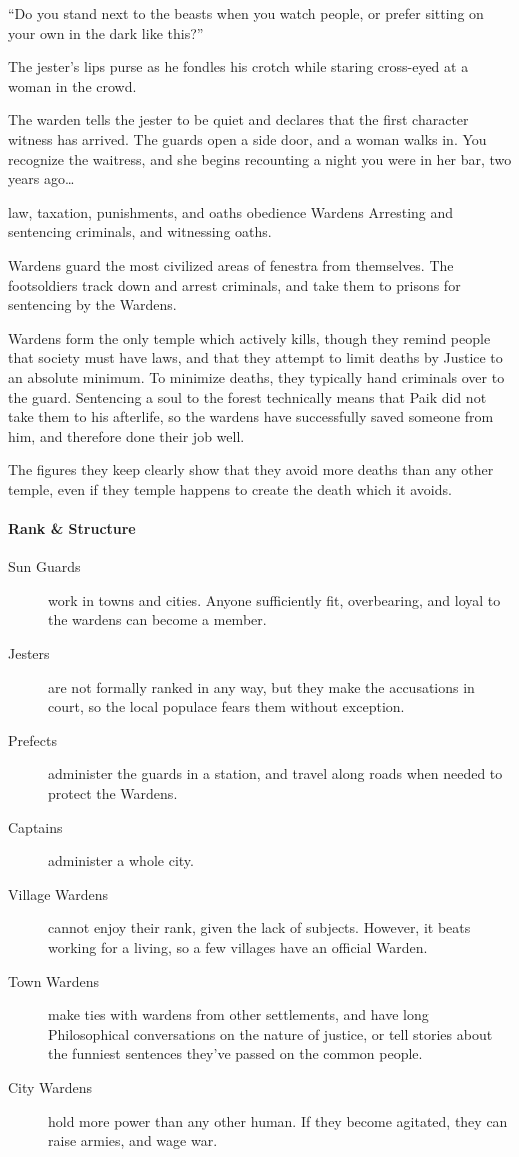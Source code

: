 \begin{multicols}{2}
{    {\sffamily ``Do you stand next to the beasts when you watch people, or prefer sitting on your own in the dark like this?''}

    The jester's lips purse as he fondles his crotch while staring cross-eyed at a woman in the crowd.

    The warden tells the jester to be quiet and declares that the first character witness has arrived.
    The guards open a side door, and a woman walks in.
    You recognize the waitress, and she begins recounting a night you were in her bar, two years ago\ldots
  }%
  {law, taxation, punishments, and oaths}%
  {obedience}%
  {Wardens}%
  {
    Arresting and sentencing criminals, and witnessing oaths.
  }%

Wardens guard the most civilized areas of \gls{fenestra} from themselves.
The footsoldiers track down and arrest criminals, and take them to prisons for sentencing by the Wardens.

Wardens form the only temple which actively kills, though they remind people that society must have laws, and that they attempt to limit deaths by Justice to an absolute minimum.
To minimize deaths, they typically hand criminals over to the \gls{guard}.
Sentencing a soul to the forest technically means that Paik did not take them to his afterlife, so the wardens have successfully saved someone from him, and therefore done their job well.

The figures they keep clearly show that they avoid more deaths than any other temple, even if they temple happens to create the death which it avoids.

\paragraph{Rank \& Structure}

\begin{description}
  \item[Sun Guards]
  work in towns and cities.
  Anyone sufficiently fit, overbearing, and loyal to the wardens can become a member.
  \item[Jesters]
  are not formally ranked in any way, but they make the accusations in court, so the local populace fears them without exception.
  \item[Prefects]
  administer the guards in a station, and travel along roads when needed to protect the Wardens.
  \item[Captains]
  administer a whole city.
  \item[Village Wardens]
  cannot enjoy their rank, given the lack of subjects.
  However, it beats working for a living, so a few villages have an official Warden.
  \item[Town Wardens]
  make ties with wardens from other settlements, and have long Philosophical conversations on the nature of justice, or tell stories about the funniest sentences they've passed on the common people.
  \item[City Wardens]
  hold more power than any other human.
  If they become agitated, they can raise armies, and wage war.
\end{description}


\end{multicols}
